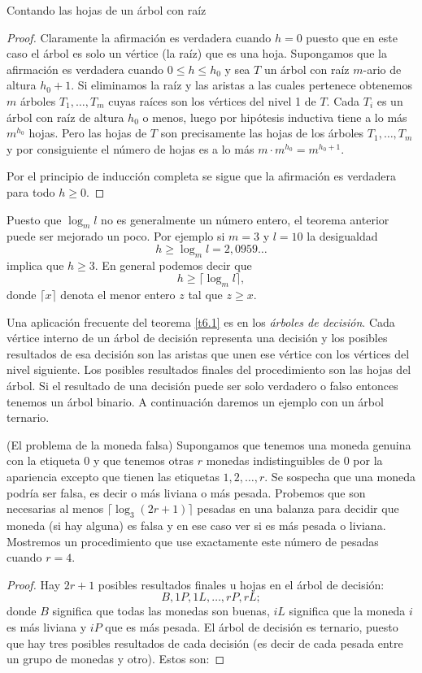 \begin{section}{Contando las hojas de un árbol con raíz}
\begin{proof}
Claramente la afirmación es verdadera cuando $h=0$ puesto que en
este caso el árbol es solo un vértice (la raíz) que es una hoja.
Supongamos que la afirmación es verdadera cuando $0\le h \le h_0$
y sea $T$ un árbol con raíz $m$-ario de altura $h_0+1$. Si
eliminamos la raíz y las aristas a las cuales pertenece obtenemos
$m$ árboles $T_1,\ldots,T_m$ cuyas raíces son los vértices del
nivel 1 de $T$. Cada $T_i$ es un árbol con raíz de altura $h_0$ o
menos, luego por hipótesis inductiva tiene a lo más $m^{h_0}$
hojas. Pero las hojas de $T$ son precisamente las hojas de los
árboles $T_1,\ldots,T_m$ y por consiguiente el número de hojas es
a lo más $m \cdot m^{h_0}= m^{h_0+1}$.

Por el principio de inducción completa se sigue que la afirmación
es verdadera para todo $h\ge 0$.
\end{proof}

Puesto que $\log_ml$ no es generalmente un número entero, el
teorema anterior puede ser mejorado un poco. Por ejemplo si $m=3$
y $l=10$ la desigualdad
$$
h \ge \log_ml=2,0959\ldots
$$
implica que $h\ge 3$. En general podemos decir que
$$
h\ge\lceil \log_ml\rceil,
$$
donde $\lceil x \rceil$ denota el menor entero $z$ tal que $z\ge
x$.

Una aplicación frecuente del teorema \ref{t6.1} es en los
{\it árboles de decisión}. Cada vértice interno de un
árbol de decisión representa una decisión y los posibles
resultados de esa decisión son las aristas que unen ese vértice
con los vértices del nivel siguiente. Los posibles resultados
finales del procedimiento son las hojas del árbol. Si el resultado
de una decisión puede ser solo verdadero o falso entonces tenemos
un árbol binario. A continuación daremos un ejemplo con un árbol
ternario.

\begin{ejemplo} \label{monedafalsa}(El problema de la moneda falsa) Supongamos
que tenemos una moneda genuina con la etiqueta $0$ y que tenemos
otras $r$ monedas indistinguibles de $0$ por la apariencia excepto
que tienen las etiquetas $1,2,\ldots,r$. Se sospecha que una
moneda podría ser falsa, es decir o más liviana o más pesada.
Probemos que son necesarias al menos $\lceil \log_3(2r+1)\rceil $
pesadas en una balanza para decidir que moneda (si hay alguna) es
falsa y en ese caso ver si es más pesada o liviana. Mostremos un
procedimiento que use exactamente este número de pesadas cuando
$r=4$.
\end{ejemplo}
\begin{proof} Hay $2r+1$ posibles resultados finales u hojas en
el árbol de decisión:
$$
B,1P,1L,\ldots,rP,rL;
$$
donde $B$ significa que todas las monedas son buenas, $iL$
significa que la moneda $i$ es más liviana y $iP$ que es más
pesada. El árbol de decisión es ternario, puesto que hay tres
posibles resultados de cada decisión (es decir de cada pesada
entre un grupo de monedas y otro). Estos son:


\end{proof}
\end{section}
